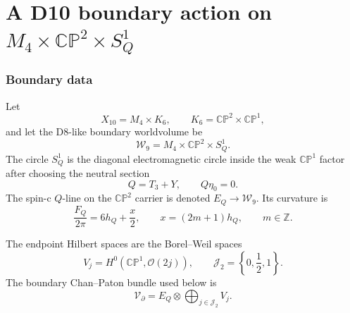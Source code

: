 \documentclass[11pt]{article}
\newcommand{\CP}{\mathbb{CP}}
\newcommand{\ZZ}{\mathbb{Z}}
\newcommand{\JJ}{\mathcal{J}}
\newcommand{\VV}{\mathcal{V}}
\newcommand{\WW}{\mathcal{W}}
\newcommand{\OO}{\mathcal{O}}
\theoremstyle{plain}
\theoremstyle{definition}
\begin{document}
\clearpage

\part{A D10 boundary action on $M_4\times\CP^2\times S^1_Q$}

\setcounter{section}{0}

\renewcommand{\thesection}{\arabic{section}}

\begin{abstract}
This note constructs the boundary action that was used only schematically in
the D10 Kaluza--Klein article.  The boundary is
\[
  \WW_9=M_4\times\CP^2\times S^1_Q\subset M_4\times\CP^2\times\CP^1 .
\]
The action contains the D8-like DBI/Wess--Zumino source, a spin-c \(Q\)-line
bundle, a group-valued endpoint degree of freedom whose quantization gives
\(H^0(\CP^1,\OO(2j))\), and a quadratic boundary/current kernel built from the
same zero-mode operator that appears in the Wilson expansion.  The construction
preserves the \(Q=T_3+Y\) photon boundary and gives a finite moduli space:
one \(U(1)_Q\) holonomy, discrete spin-c and D8-charge data, the common boundary
scale, a direct electroweak-vacuum modulus, a scalar-curvature modulus for the
Higgs mode, and a current-metric deformation whose canonical slice is the unit
zero-mode map.
\end{abstract}

\section{Boundary data}
\label{bd:sec:boundary-data}

Let
\[
  X_{10}=M_4\times K_6,\qquad K_6=\CP^2\times\CP^1 ,
\]
and let the D8-like boundary worldvolume be
\begin{equation}
  \WW_9=M_4\times\CP^2\times S^1_Q .
  \label{bd:eq:w9}
\end{equation}
The circle \(S^1_Q\) is the diagonal electromagnetic circle inside the weak
\(\CP^1\) factor after choosing the neutral section
\[
  Q=T_3+Y,\qquad Q\eta_0=0 .
  \label{bd:eq:qneutral}
\]
The spin-c \(Q\)-line on the \(\CP^2\) carrier is denoted \(E_Q\to\WW_9\).
Its curvature is
\begin{equation}
  \frac{F_Q}{2\pi}=6h_Q+\frac{x}{2},\qquad
  x=(2m+1)h_Q,\qquad m\in\ZZ .
  \label{bd:eq:spinc-curvature}
\end{equation}

The endpoint Hilbert spaces are the Borel--Weil spaces
\begin{equation}
  V_j=H^0(\CP^1,\OO(2j)),\qquad
  \JJ_2=\left\{0,\frac12,1\right\}.
  \label{bd:eq:vj}
\end{equation}
The boundary Chan--Paton bundle used below is
\begin{equation}
  \VV_{\partial}
  =
  E_Q\otimes
  \bigoplus_{j\in\JJ_2}V_j .
  \label{bd:eq:vboundary}
\end{equation}
\end{document}
